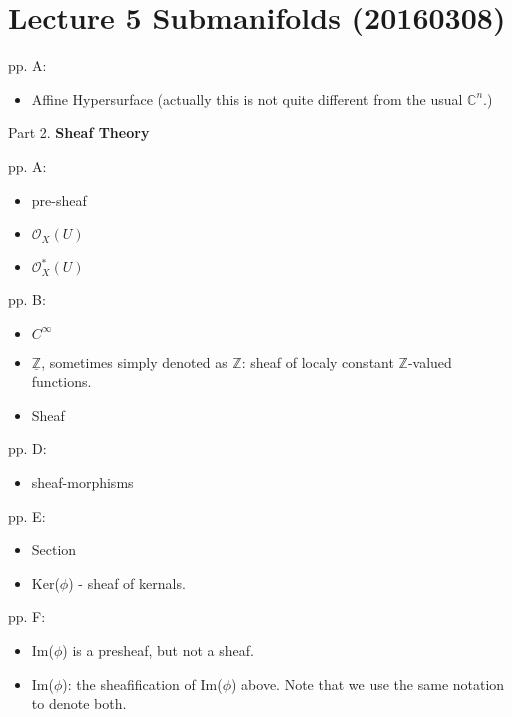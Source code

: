 \documentclass{book}
\numberwithin{equation}{subsection} %
\theoremstyle{definition}
\begin{document}
\section{Lecture 5 Submanifolds (20160308)}

pp. A:
    \begin{itemize}
        \item Affine Hypersurface (actually this is not quite different from the usual $\mathbb{C}^n$.)
    \end{itemize}
	
Part 2. \textbf{Sheaf Theory}

pp. A:
	\begin{itemize}
		\item pre-sheaf
		\item $\mathcal{O}_X(U)$
		\item $\mathcal{O}^*_X(U)$
	\end{itemize}
pp. B:
	\begin{itemize}
		\item $C^{\infty}$
		\item $\mathbb{\underline{Z}}$, sometimes simply denoted as $\mathbb{Z}$: sheaf of localy constant $\mathbb{Z}$-valued functions.
		\item Sheaf
	\end{itemize}
pp. D:
	\begin{itemize}
		\item sheaf-morphisms
	\end{itemize}
pp. E:
	\begin{itemize}
		\item Section
		\item Ker($\phi$) - sheaf of kernals.
	\end{itemize}
pp. F:
	\begin{itemize}
		\item Im($\phi$) is a presheaf, but not a sheaf.
		\item Im($\phi$): the sheafification of Im($\phi$) above. Note that we use the same notation to denote both.
	\end{itemize}
	
\end{document}
